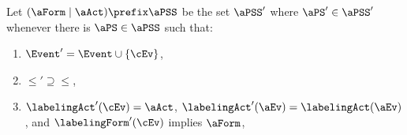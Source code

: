 \begin{definition}
  \label{def:prefix}
Let $(\aForm \mid \aAct) \prefix \aPSS$ be the set $\aPSS'$ where $\aPS'\in\aPSS'$ whenever
there is $\aPS\in\aPSS$ such that:
\begin{enumerate}
\item\label{pre-E} $\Event' = \Event \cup \{\cEv\}$,
\item\label{pre-le} ${\le'}\supseteq{\le}$, %
\item\label{pre-act} $\labelingAct'(\cEv) = \aAct$, $\labelingAct'(\aEv) = \labelingAct(\aEv)$, and
   $\labelingForm'(\cEv)$ implies $\aForm$,

\end{enumerate}
\end{definition}
